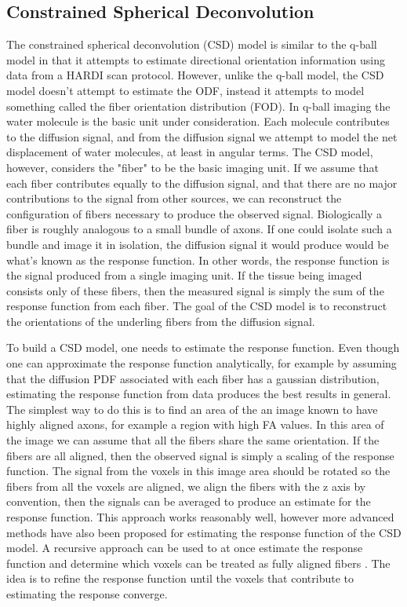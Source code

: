 \subsection{Constrained Spherical Deconvolution}

The constrained spherical deconvolution (CSD) model is similar to the q-ball model in that it attempts to estimate directional orientation information using data from a HARDI scan protocol. However, unlike the q-ball model, the CSD model doesn't attempt to estimate the ODF, instead it attempts to model something called the fiber orientation distribution (FOD). In q-ball imaging the water molecule is the basic unit under consideration. Each molecule contributes to the diffusion signal, and from the diffusion signal we attempt to model the net displacement of water molecules, at least in angular terms. The CSD model, however, considers the "fiber" to be the basic imaging unit. If we assume that each fiber contributes equally to the diffusion signal, and that there are no major contributions to the signal from other sources, we can reconstruct the configuration of fibers necessary to produce the observed signal. Biologically a fiber is roughly analogous to a small bundle of axons. If one could isolate such a bundle and image it in isolation, the diffusion signal it would produce would be what's known as the response function. In other words, the response function is the signal produced from a single imaging unit. If the tissue being imaged consists only of these fibers, then the measured signal is simply the sum of the response function from each fiber. The goal of the CSD model is to reconstruct the orientations of the underling fibers from the diffusion signal.

To build a CSD model, one needs to estimate the response function. Even though one can approximate the response function analytically, for example by assuming that the diffusion PDF associated with each fiber has a gaussian distribution, estimating the response function from data produces the best results in general. The simplest way to do this is to find an area of the an image known to have highly aligned axons, for example a region with high FA values. In this area of the image we can assume that all the fibers share the same orientation. If the fibers are all aligned, then the observed signal is simply a scaling of the response function. The signal from the voxels in this image area should be rotated so the fibers from all the voxels are aligned, we align the fibers with the z axis by convention, then the signals can be averaged to produce an estimate for the response function. This approach works reasonably well, however more advanced methods have also been proposed for estimating the response function of the CSD model. A recursive approach can be used to at once estimate the response function and determine which voxels can be treated as fully aligned fibers \cite{Tax_2014}. The idea is to refine the response function until the voxels that contribute to estimating the response converge.

